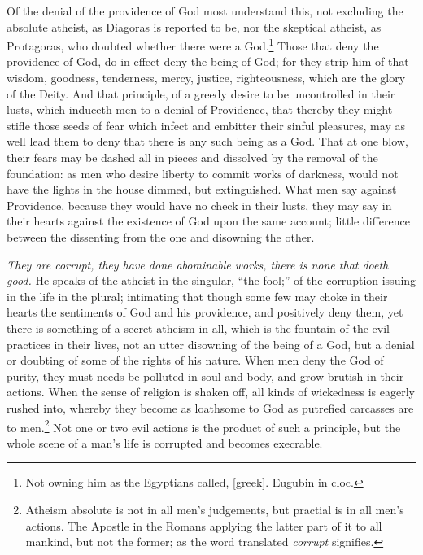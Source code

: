 \documentclass{article}
\newcommand{\grk}{[greek]}
\begin{document}
Of the denial of the providence of God most understand this, 
    not excluding the absolute atheist, as Diagoras is reported to be, 
    nor the skeptical atheist, as Protagoras, 
    who doubted whether there were a God.\footnote{
    Not owning him as the Egyptians called, \grk . Eugubin in cloc.}
Those that deny the providence of God, do in effect deny the being of God; 
    for they strip him of that wisdom, goodness, tenderness,
    mercy, justice, righteousness, which are the glory of the Deity.
And that principle, of a greedy desire to be uncontrolled in their lusts, 
    which induceth men to a denial of Providence, 
    that thereby they might stifle those seeds of fear 
    which infect and embitter their sinful pleasures, 
    may as well lead them to deny that there is any such being as a God. 
That at one blow, their fears may be dashed all in pieces 
    and dissolved by the removal of the foundation:
    as men who desire liberty to commit works of darkness, 
    would not have the lights in the house dimmed, but extinguished. 
What men say against Providence, 
    because they would have no check in their lusts, 
    they may say in their hearts against the existence of God 
    upon the same account; 
    little difference between the dissenting from the one and 
    disowning the other.

\emph{They are corrupt, they have done abominable works, 
    there is none that doeth good.} 
He speaks of the atheist in the singular, ``the fool;'' 
    of the corruption issuing in the life in the plural; 
    intimating that though some few may choke in their hearts 
    the sentiments of God and his providence, and positively deny them, 
    yet there is something of a secret atheism in all, 
    which is the fountain of the evil practices in their lives, 
    not an utter disowning of the being of a God, 
    but a denial or doubting of some of the rights of his nature. 
When men deny the God of purity, 
    they must needs be polluted in soul and body,
    and grow brutish in their actions. 
When the sense of religion is %
    shaken off, 
    all kinds of wickedness is eagerly rushed into, 
    whereby they become as loathsome to God as putrefied carcasses are to men.\footnote{
    Atheism absolute is not in all men's judgements,
    but practial is in all men's actions.
    The Apostle in the Romans applying the latter part of it to all mankind,
    but not the former;
    as the word translated \emph{corrupt} signifies.}
Not one or two evil actions is the product of such a principle, 
    but the whole scene of a man’s life is corrupted and becomes execrable.
\end{document}
